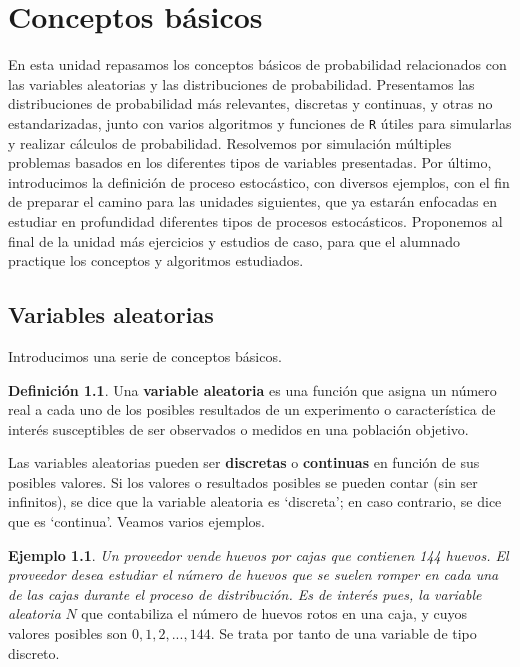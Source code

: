 \documentclass[
]{book}
\newenvironment{yellowbox}{
  \definecolor{shadecolor}{rgb}{210, 180, 140}  
  \color{black}
  \begin{shaded}}
 {\end{shaded}}
\theoremstyle{definition}
\newtheorem{definition}{Definición}[chapter]
\theoremstyle{definition}
\newtheorem{example}{Ejemplo}[chapter]
\theoremstyle{definition}
\theoremstyle{definition}
\theoremstyle{remark}
\begin{document}
\hypertarget{intro}{%
\chapter{Conceptos básicos}\label{intro}}

En esta unidad repasamos los conceptos básicos de probabilidad relacionados con las variables aleatorias y las distribuciones de probabilidad. Presentamos las distribuciones de probabilidad más relevantes, discretas y continuas, y otras no estandarizadas, junto con varios algoritmos y funciones de \texttt{R} útiles para simularlas y realizar cálculos de probabilidad. Resolvemos por simulación múltiples problemas basados en los diferentes tipos de variables presentadas. Por último, introducimos la definición de proceso estocástico, con diversos ejemplos, con el fin de preparar el camino para las unidades siguientes, que ya estarán enfocadas en estudiar en profundidad diferentes tipos de procesos estocásticos. Proponemos al final de la unidad más ejercicios y estudios de caso, para que el alumnado practique los conceptos y algoritmos estudiados.

\hypertarget{variables-aleatorias}{%
\section{Variables aleatorias}\label{variables-aleatorias}}

Introducimos una serie de conceptos básicos.

\begin{yellowbox}

\begin{definition}
\protect\hypertarget{def:randomvar}{}\label{def:randomvar}Una \textbf{variable aleatoria} es una función que asigna un número real a cada uno de los posibles resultados de un experimento o característica de interés susceptibles de ser observados o medidos en una población objetivo.
\end{definition}

\end{yellowbox}

Las variables aleatorias pueden ser \textbf{discretas} o \textbf{continuas} en función de sus posibles valores. Si los valores o resultados posibles se pueden contar (sin ser infinitos), se dice que la variable aleatoria es `discreta'; en caso contrario, se dice que es `continua'. Veamos varios ejemplos.

\begin{example}
\protect\hypertarget{exm:rvdiscreta}{}\label{exm:rvdiscreta}\emph{Un proveedor vende huevos por cajas que contienen 144 huevos. El proveedor desea estudiar el número de huevos que se suelen romper en cada una de las cajas durante el proceso de distribución. Es de interés pues, la variable aleatoria} \(N\) que contabiliza el número de huevos rotos en una caja, y cuyos valores posibles son \(0, 1, 2,..., 144\). Se trata por tanto de una variable de tipo discreto.
\end{example}
\end{document}
